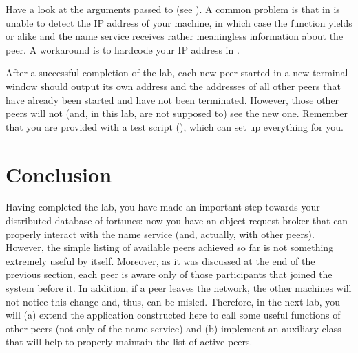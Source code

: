 \documentclass[a4paper]{article}
\begin{document}
Have a look at the arguments passed to  (see ). A
common problem is that  in  is
unable to detect the IP address of your machine, in which case the function
yields  or alike and the name service receives rather
meaningless information about the peer. A workaround is to hardcode your IP
address in .

After a successful completion of the lab, each new peer started in a new
terminal window should output its own address and the addresses of all other
peers that have already been started and have not been terminated. However,
those other peers will not (and, in this lab, are not supposed to) see the new
one. Remember that you are provided with a test script
(), which can set up everything for you.

\section{Conclusion}
Having completed the lab, you have made an important step towards your
distributed database of fortunes: now you have an object request broker that can
properly interact with the name service (and, actually, with other peers).
However, the simple listing of available peers achieved so far is not something
extremely useful by itself. Moreover, as it was discussed at the end of the
previous section, each peer is aware only of those participants that joined the
system before it. In addition, if a peer leaves the network, the other machines
will not notice this change and, thus, can be misled. Therefore, in the next
lab, you will (a) extend the application constructed here to call some useful
functions of other peers (not only of the name service) and (b) implement an
auxiliary class that will help to properly maintain the list of active peers.

\printbibliography
\end{document}
